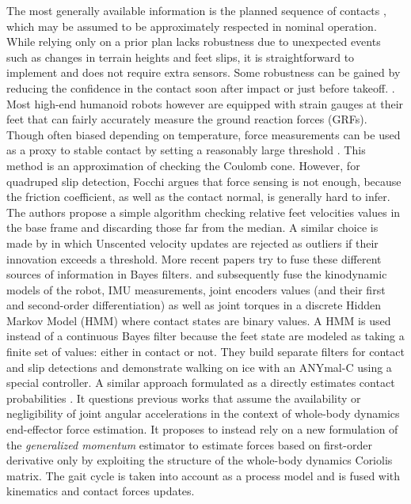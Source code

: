 The most generally available information is the planned sequence of contacts \cite{bledt2018contact}, which may be assumed to be approximately respected in nominal operation. 
While relying only on a prior plan lacks robustness due to unexpected events such as changes in terrain heights and feet slips, it is straightforward to implement and 
does not require extra sensors. Some robustness can be gained by reducing the confidence in the contact soon after impact or just before takeoff. 
\cite{leziart2021implementation, bledt2018contact}. Most high-end humanoid robots however \cite{stasse2017talos, englsberger2014overview} are 
equipped with strain gauges at their feet that can fairly accurately measure the ground reaction forces (GRFs). 
Though often biased depending on temperature, force measurements can be used as a proxy to stable contact by setting a reasonably large threshold \cite{fallon2014drift}. 
This method is an approximation of checking the Coulomb cone.
However, for quadruped slip detection, Focchi \cite{Focchi2015SlipDA} argues that force sensing is not enough, because the friction coefficient,
as well as the contact normal, is generally hard to infer. The authors propose a simple algorithm checking relative feet velocities values in the base frame and discarding those
far from the median. A similar choice is made by \cite{bloesch2013stateSlippery} in which Unscented \KalmanF velocity updates are rejected as outliers if their innovation exceeds a threshold.  
More recent papers try to fuse these different sources of information in Bayes filters. \cite{hwangbo2016probabilistic} and subsequently \cite{jenelten2019dynamic} fuse 
the kinodynamic models of the robot, IMU measurements, joint encoders values (and their first and second-order differentiation) as well as
joint torques in a discrete Hidden Markov Model (HMM) where contact states are binary values. A HMM is used instead of a continuous Bayes filter because the feet state are modeled as taking a finite set of values: either in contact or not.
They build separate filters for contact and slip detections and demonstrate walking on ice with an 
\mbox{ANYmal-C} using a special controller. A similar approach formulated as a \KalmanF directly estimates contact probabilities \cite{bledt2018contact}. 
It questions previous works that assume the availability  \cite{hwangbo2016probabilistic} or negligibility \cite{camurri2017probabilistic} of joint angular 
accelerations in the context of whole-body dynamics end-effector force estimation.
It proposes to instead rely on a new formulation of the \textit{generalized momentum} estimator to estimate forces based on first-order derivative only by exploiting the 
structure of the whole-body dynamics Coriolis matrix. The gait cycle is taken into account as a process model and is fused with kinematics and contact forces updates.  

